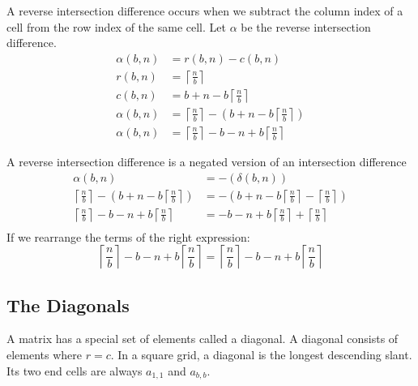 \documentclass[letterpaper, twoside,12pt]{article}
\begin{document}
    A reverse intersection difference occurs when we subtract the column index of a cell from the row index of the same cell. Let $\alpha$ be the reverse intersection difference.
    \begin{equation}
        \begin{split}
            \alpha(b,n) &= r(b,n) - c(b,n)\\
            r(b,n) &= \left\lceil \frac{n}{b} \right\rceil \\
            c(b,n) &= b + n - b\left\lceil \frac{n}{b} \right\rceil \\
            \alpha(b,n) &= \left\lceil \frac{n}{b} \right\rceil - (b + n - b\left\lceil \frac{n}{b} \right\rceil)\\
            \alpha(b,n) &= \left\lceil \frac{n}{b} \right\rceil - b - n + b\left\lceil \frac{n}{b} \right\rceil
        \end{split}
    \end{equation}

    A reverse intersection difference is a negated version of an intersection difference
    \begin{equation}
        \begin{split}
            \alpha(b,n) &= -(\delta(b,n))\\
            \left\lceil \frac{n}{b} \right\rceil - (b + n - b\left\lceil \frac{n}{b} \right\rceil) &= - ( b + n - b\left\lceil \frac{n}{b} \right\rceil - \left\lceil \frac{n}{b} \right\rceil)\\
            \left\lceil \frac{n}{b} \right\rceil - b - n + b\left\lceil \frac{n}{b} \right\rceil &= - b - n + b\left\lceil \frac{n}{b} \right\rceil + \left\lceil \frac{n}{b} \right\rceil\\
        \end{split}
    \end{equation}
    If we rearrange the terms of the right expression:
    \begin{equation*}
        \left\lceil \frac{n}{b} \right\rceil - b - n + b\left\lceil \frac{n}{b} \right\rceil = \left\lceil \frac{n}{b} \right\rceil - b - n + b\left\lceil \frac{n}{b} \right\rceil
    \end{equation*}

    \subsection{The Diagonals}
    A matrix has a special set of elements called a diagonal. A diagonal consists of elements where $r = c$. In a square grid, a diagonal is the longest descending slant. Its two end cells are always $a_{1,1}$ and $a_{b,b}$.
\end{document}
